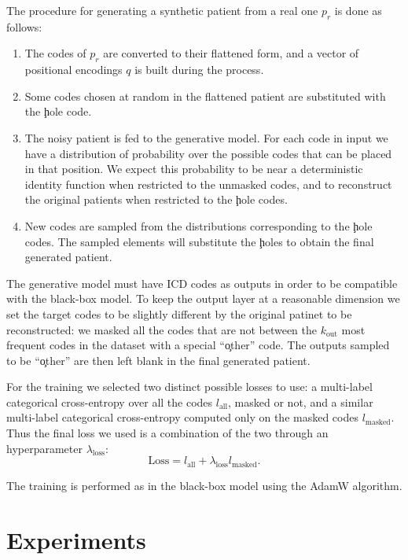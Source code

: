 \documentclass[]{marticle}
\begin{document}
The procedure for generating a synthetic patient from a real one $p_r$ is done as follows:
\begin{enumerate}
\item The codes of $p_r$ are converted to their flattened form, and a vector of positional encodings
$q$ is built during the process.

\item Some codes chosen at random in the flattened patient are substituted with the \c{hole} code.

\item The noisy patient is fed to the generative model. For each code in input we have a
distribution of probability over the possible codes that can be placed in that position. We expect
this probability to be near a deterministic identity function when restricted to the unmasked codes,
and to reconstruct the original patients when restricted to the \c{hole} codes. 

\item New codes are sampled from the distributions corresponding to the \c{hole} codes. The sampled
elements will substitute the \c{hole}s to obtain the final generated patient.
\end{enumerate}

The generative model must have ICD codes as outputs in order to be compatible with the black-box
model. To keep the output layer at a reasonable dimension we set the target codes to be slightly
different by the original patinet to be reconstructed: we masked all the codes that are not between
the $k_\text{out}$ most frequent codes in the dataset with a special ``\c{other}'' code. The outputs
sampled to be ``\c{other}'' are then left blank in the final generated patient.

For the training we selected two distinct possible losses to use: a multi-label categorical
cross-entropy over all the codes $l_\text{all}$, masked or not, and a similar multi-label
categorical cross-entropy computed only on the masked codes $l_\text{masked}$. Thus the final loss we
used is a combination of the two through an hyperparameter $\lambda _\text{loss}$:
$$ \text{Loss} = l_\text{all} + \lambda_\text{loss} l_\text{masked}. $$

The training is performed as in the black-box model using the AdamW algorithm.

\section{Experiments}
\end{document}
